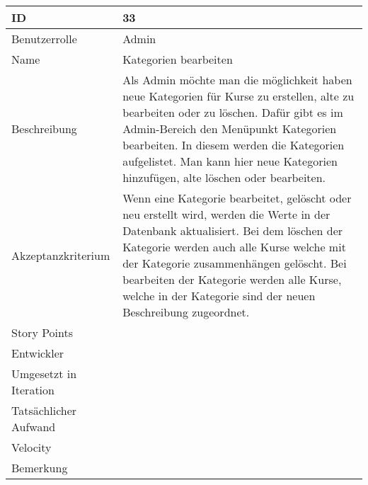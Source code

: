 \begin{tabularx}{\textwidth}{|p{}|X|}
	\hline
	ID & 33 \\
	\hline
	Benutzerrolle & Admin \\
	\hline
	Name & Kategorien bearbeiten\\
	\hline
	Beschreibung & Als Admin möchte man die möglichkeit haben neue Kategorien für Kurse zu erstellen, alte zu bearbeiten oder zu löschen. Dafür gibt es im Admin-Bereich den Menüpunkt Kategorien bearbeiten. In diesem werden die Kategorien aufgelistet. Man kann hier neue Kategorien hinzufügen, alte löschen oder bearbeiten. \\
	\hline
	Akzeptanzkriterium & Wenn eine Kategorie bearbeitet, gelöscht oder neu erstellt wird, werden die Werte in der Datenbank aktualisiert. Bei dem löschen der Kategorie werden auch alle Kurse welche mit der Kategorie zusammenhängen gelöscht. Bei bearbeiten der Kategorie werden alle Kurse, welche in der Kategorie sind der neuen Beschreibung zugeordnet. \\
	\hline
	Story Points &  \\
	\hline
	Entwickler &  \\
	\hline
	Umgesetzt in Iteration & \\
	\hline
	Tatsächlicher Aufwand & \\
	\hline
	Velocity & \\
	\hline
	Bemerkung & \\
	\hline
\end{tabularx}
\vspace{20pt}
